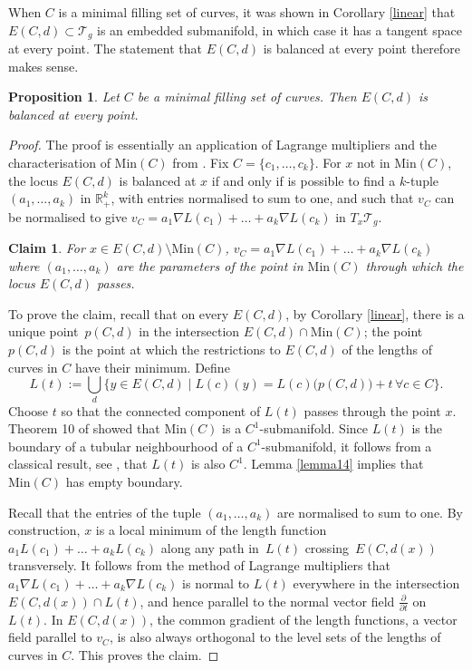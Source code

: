 \documentclass[pdftex]{sigma}
\numberwithin{equation}{section}
\newtheorem{Proposition}[Theorem]{Proposition}
\newtheorem*{Claim}{Claim}
{ \theoremstyle{definition}
 \newtheorem{Definition}[Theorem]{Definition}
 \newtheorem{Note}[Theorem]{Note}
 \newtheorem{Example}[Theorem]{Example}
 \newtheorem{Remark}[Theorem]{Remark}
 \newtheorem{observation}[Theorem]{Observation}
}
\begin{document}
\begin{Remark}
When $C$ is a minimal filling set of curves, it was shown in Corollary \ref{linear} that~${E(C,d)\subset \mathcal{T}_{g}}$ is an embedded submanifold, in which case it has a tangent space at every point. The statement that $E(C,d)$ is balanced at every point therefore makes sense.
\end{Remark}
\begin{Proposition}
\label{balancedlem}
Let $C$ be a minimal filling set of curves. Then $E(C,d)$ is balanced at every point.
\end{Proposition}
\begin{proof}
The proof is essentially an application of Lagrange multipliers and the characterisation of $\mathrm{Min}(C)$ from \cite{SchmutzMorse}. Fix $C=\{c_{1}, \dots, c_{k}\}$. For $x$ not in $\mathrm{Min}(C)$, the locus $E(C,d)$ is balanced at $x$ if and only if is possible to find a $k$-tuple $(a_{1}, \dots, a_{k})$ in $\mathbb{R}_{+}^{k}$, with entries normalised to sum to one, and such that $v_{C}$ can be normalised to give $v_{C}=a_{1}\nabla L(c_{1})+\dots+a_{k}\nabla L(c_{k})$ in $T_{x}\mathcal{T}_{g}$.

\begin{Claim} For $x\in E(C,d)\setminus \mathrm{Min}(C)$, $v_{C}=a_{1}\nabla L(c_{1})+\dots+a_{k}\nabla L(c_{k})$ where $(a_{1}, \dots, a_{k})$ are the parameters of the point in $\mathrm{Min}(C)$ through which the locus $E(C,d)$ passes.
\end{Claim}

To prove the claim, recall that on every $E(C, d)$, by Corollary \ref{linear}, there is a unique point~$p(C,d)$ in the intersection $E(C,d)\cap\mathrm{Min}(C)$; the point $p(C,d)$ is the point at which the restrictions to $E(C,d)$ of the lengths of curves in $C$ have their minimum. Define
\begin{equation*}
 L(t):=\bigcup_{d}\{y\in E(C,d) \mid L(c)(y)=L(c)\bigl(p(C,d)\bigr)+t \, \forall c\in C\}.
\end{equation*}
Choose $t$ so that the connected component of $L(t)$ passes through the point $x$. Theorem 10 of \cite{SchmutzMorse} showed that $\mathrm{Min}(C)$ is a $C^{1}$-submanifold. Since $L(t)$ is the boundary of a tubular neighbourhood of a $C^{1}$-submanifold, it follows from a classical result, see \cite{Foote}, that $L(t)$ is also $C^{1}$. Lemma \ref{lemma14} implies that $\mathrm{Min}(C)$ has empty boundary.

Recall that the entries of the tuple $(a_{1}, \dots, a_{k})$ are normalised to sum to one. By construction, $x$ is a local minimum of the length function $a_{1}L(c_{1})+\dots+a_{k}L(c_{k})$ along any path in~$L(t)$ crossing~$E(C,d(x))$ transversely. It follows from the method of Lagrange multipliers that~${a_{1}\nabla L(c_{1})+\dots+a_{k}\nabla L(c_{k})}$ is normal to $L(t)$ everywhere in the intersection $E(C,d(x))\cap L(t)$, and hence parallel to the normal vector field $\frac{\partial}{\partial t}$ on $L(t)$. In $E(C,d(x))$, the common gradient of the length functions, a vector field parallel to $v_{C}$, is also always orthogonal to the level sets of the lengths of curves in $C$. This proves the claim.


\end{proof}
\end{document}
